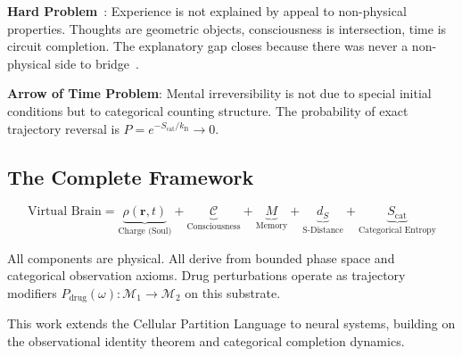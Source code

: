 \documentclass[aps,prd,twocolumn,superscriptaddress,floatfix,nofootinbib]{revtex4-2}
\theoremstyle{remark}
\newcommand{\Ccat}{\mathcal{C}}
\newcommand{\Pop}{P}
\newcommand{\kB}{k_{\mathrm{B}}}
\newcommand{\Mstate}{\mathcal{M}}
\newcommand{\dS}{d_S}
\newcommand{\Scatent}{S_{\mathrm{cat}}}
\begin{document}
\textbf{Hard Problem}~\cite{chalmers1995facing,chalmers1996conscious}: Experience is not explained by appeal to non-physical properties. Thoughts are geometric objects, consciousness is intersection, time is circuit completion. The explanatory gap closes because there was never a non-physical side to bridge~\cite{dennett1991consciousness}.

\textbf{Arrow of Time Problem}: Mental irreversibility is not due to special initial conditions but to categorical counting structure. The probability of exact trajectory reversal is $P = e^{-\Scatent/\kB} \to 0$.

\subsection{The Complete Framework}

\begin{equation}
\text{Virtual Brain} = \underbrace{\rho(\mathbf{r},t)}_{\text{Charge (Soul)}} + \underbrace{\Ccat}_{\text{Consciousness}} + \underbrace{M}_{\text{Memory}} + \underbrace{\dS}_{\text{S-Distance}} + \underbrace{\Scatent}_{\text{Categorical Entropy}}
\end{equation}

All components are physical. All derive from bounded phase space and categorical observation axioms. Drug perturbations operate as trajectory modifiers $\Pop_{\mathrm{drug}}(\omega): \Mstate_1 \to \Mstate_2$ on this substrate.

\begin{acknowledgments}
This work extends the Cellular Partition Language to neural systems, building on the observational identity theorem and categorical completion dynamics.
\end{acknowledgments}



\end{document}

